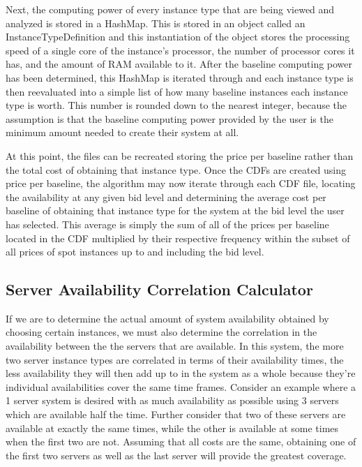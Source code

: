 \documentclass[thesis,proposal]{umassthesis}  %
\begin{document}
Next, the computing power of every instance type that are being viewed and analyzed is stored in a HashMap. This is stored in an object called an InstanceTypeDefinition and this instantiation of the object stores the processing speed of a single core of the instance's processor, the number of processor cores it has, and the amount of RAM available to it. After the baseline computing power has been determined, this HashMap is iterated through and each instance type is then reevaluated into a simple list of how many baseline instances each instance type is worth. This number is rounded down to the nearest integer, because the assumption is that the baseline computing power provided by the user is the minimum amount needed to create their system at all.\par

At this point, the files can be recreated storing the price per baseline rather than the total cost of obtaining that instance type. Once the CDFs are created using price per baseline, the algorithm may now iterate through each CDF file, locating the availability at any given bid level and determining the average cost per baseline of obtaining that instance type for the system at the bid level the user has selected. This average is simply the sum of all of the prices per baseline located in the CDF multiplied by their respective frequency within the subset of all prices of spot instances up to and including the bid level.\par


\subsection{Server Availability Correlation Calculator}

If we are to determine the actual amount of system availability obtained by choosing certain instances, we must also determine the correlation in the availability between the the servers that are available. In this system, the more two server instance types are correlated in terms of their availability times, the less availability they will then add up to in the system as a whole because they're individual availabilities cover the same time frames. Consider an example where a 1 server system is desired with as much availability as possible using 3 servers which are available half the time. Further consider that two of these servers are available at exactly the same times, while the other is available at some times when the first two are not. Assuming that all costs are the same, obtaining one of the first two servers as well as the last server will provide the greatest coverage.\par
\end{document}
